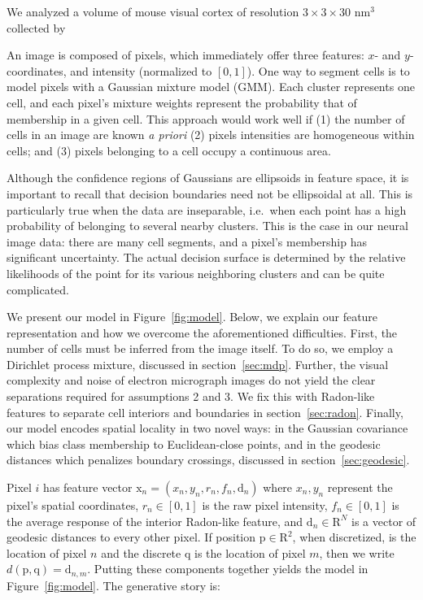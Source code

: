 \documentclass[english]{article}
\newcommand{\+}[1]{\ensuremath{\boldsymbol{\mathrm{#1}}}}
\begin{document}
We analyzed a  volume of mouse visual cortex of resolution $3 \times 3 \times 30 \text{ nm}^3$ collected by 

An image is composed of pixels, which immediately offer three features: $x$- and $y$- coordinates, and intensity (normalized to $[0,1]$). One way to segment cells is to model pixels with a Gaussian mixture model (GMM). Each cluster represents one cell, and each pixel's mixture weights represent the probability that of membership in a given cell. This approach would work well if (1) the number of cells in an image are known \emph{a priori} (2) pixels intensities are homogeneous within cells; and (3) pixels belonging to a cell occupy a continuous area.

Although the confidence regions of Gaussians are ellipsoids in feature space, it is important to recall that decision boundaries need not be ellipsoidal at all. This is particularly true when the data are inseparable, i.e.~when each point has a high probability of belonging to several nearby clusters. This is the case in our neural image data: there are many cell segments, and a pixel's membership has significant uncertainty. The actual decision surface is determined by the relative likelihoods of the point for its various neighboring clusters and can be quite complicated.

We present our model in Figure~\ref{fig:model}. Below, we explain our feature representation and how we overcome the aforementioned difficulties. First, the number of cells must be inferred from the image itself. To do so, we employ a Dirichlet process mixture, discussed in section~\ref{sec:mdp}. Further, the visual complexity and noise of electron micrograph images do not yield the clear separations required for assumptions 2 and 3. We fix this with Radon-like features \cite{Kumar2010} to separate cell interiors and boundaries in section~\ref{sec:radon}. Finally, our model encodes spatial locality in two novel ways: in the Gaussian covariance which bias class membership to Euclidean-close points, and in the geodesic distances which penalizes boundary crossings, discussed in section~\ref{sec:geodesic}.

Pixel $i$ has feature vector $\+{x}_n = (x_n, y_n, r_n, f_n, \+{d}_n)$ where $x_n, y_n$ represent the pixel's spatial coordinates, $r_n \in [0,1]$ is the raw pixel intensity, $f_n \in [0,1]$ is the average response of the interior Radon-like feature, and $\+{d}_n \in \+{R}^N$ is a vector of geodesic distances to every other pixel. If position $\+p \in \+R^2$, when discretized, is the location of pixel $n$ and the discrete $\+q$ is the location of pixel $m$, then we write $d(\+p, \+q) = \+d_{n,m}$. Putting these components together yields the model in Figure~\ref{fig:model}. The generative story is:
\end{document}

